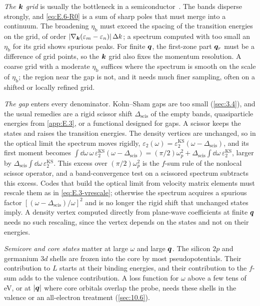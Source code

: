 \emph{The $\bm{k}$ grid} is usually the bottleneck in a semiconductor~\cite{albrecht1998ab}. The bands disperse strongly, and \cref{eq:E.6-R0} is a sum of sharp poles that must merge into a continuum. The broadening $\eta_{\mathrm{b}}$ must exceed the spacing of the transition energies on the grid, of order $|\nabla_{\bm{k}}(\varepsilon_m - \varepsilon_n)|\,\Delta k$; a spectrum computed with too small an $\eta_{\mathrm{b}}$ for its grid shows spurious peaks. For finite $\bm{q}$, the first-zone part $\bm{q}_r$ must be a difference of grid points, so the $\bm{k}$ grid also fixes the momentum resolution. A coarse grid with a moderate $\eta_{\mathrm{b}}$ suffices where the spectrum is smooth on the scale of $\eta_{\mathrm{b}}$; the region near the gap is not, and it needs much finer sampling, often on a shifted or locally refined grid.

\emph{The gap} enters every denominator. Kohn--Sham gaps are too small (\cref{sec:3.4}), and the usual remedies are a rigid scissor shift $\Delta_{\mathrm{scis}}$ of the empty bands, quasiparticle energies from \cref{app:E.3}, or a functional designed for gaps. A scissor keeps the states and raises the transition energies. The density vertices are unchanged, so in the optical limit the spectrum moves rigidly, $\varepsilon_2(\omega) = \varepsilon_2^{\mathrm{KS}}(\omega - \Delta_{\mathrm{scis}})$, and its first moment becomes $\int\dd\omega\,\omega\,\varepsilon_2^{\mathrm{KS}}(\omega - \Delta_{\mathrm{scis}}) = (\pi/2)\omega_p^2 + \Delta_{\mathrm{scis}}\int\dd\omega\,\varepsilon_2^{\mathrm{KS}}$, larger by $\Delta_{\mathrm{scis}}\int\dd\omega\,\varepsilon_2^{\mathrm{KS}}$. This excess over $(\pi/2)\omega_p^2$ is the $f$-sum rule of the nonlocal scissor operator, and a band-convergence test on a scissored spectrum subtracts this excess. Codes that build the optical limit from velocity matrix elements must rescale them as in \cref{eq:E.3-vrescale}; otherwise the spectrum acquires a spurious factor $[(\omega - \Delta_{\mathrm{scis}})/\omega]^2$ and is no longer the rigid shift that unchanged states imply. A density vertex computed directly from plane-wave coefficients at finite $\bm{q}$ needs no such rescaling, since the vertex depends on the states and not on their energies.

\emph{Semicore and core states} matter at large $\omega$ and large $\bm{q}$. The silicon $2p$ and germanium $3d$ shells are frozen into the core by most pseudopotentials. Their contribution to $L$ starts at their binding energies, and their contribution to the $f$-sum adds to the valence contribution. A loss function for $\omega$ above a few tens of eV, or at $|\bm{q}|$ where core orbitals overlap the probe, needs these shells in the valence or an all-electron treatment (\cref{sec:10.6}).

